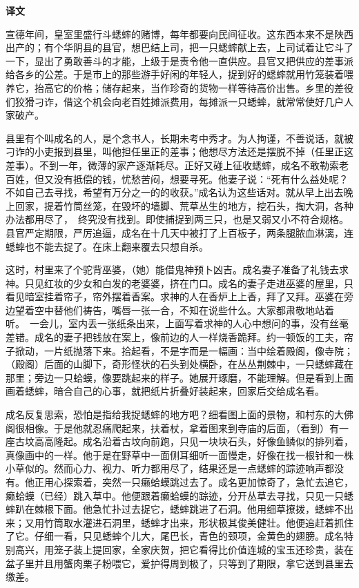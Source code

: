 \documentclass[12pt,UTF-8,openany,a4]{ctexbook}
\begin{document}
\newpage

\begin{Large}
    \noindent\textbf{译文}
\end{Large}


\vspace{1em}

\begin{large}
    \yiwen 
    宣德年间，皇室里盛行斗蟋蟀的赌博，每年都要向民间征收。这东西本来不是陕西出产的；有个华阴县的县官，想巴结上司，把一只蟋蟀献上去，上司试着让它斗了一下，显出了勇敢善斗的才能，上级于是责令他一直供应。县官又把供应的差事派给各乡的公差。于是市上的那些游手好闲的年轻人，捉到好的蟋蟀就用竹笼装着喂养它，抬高它的价格；储存起来，当作珍奇的货物一样等待高价出售。乡里的差役们狡猾刁诈，借这个机会向老百姓摊派费用，每摊派一只蟋蟀，就常常使好几户人家破产。
    
    县里有个叫成名的人，是个念书人，长期未考中秀才。为人拘谨，不善说话，就被刁诈的小吏报到县里，叫他担任里正的差事；他想尽方法还是摆脱不掉（任里正这差事）。不到一年，微薄的家产逐渐耗尽。正好又碰上征收蟋蟀，成名不敢勒索老百姓，但又没有抵偿的钱，忧愁苦闷，想要寻死。他妻子说：“死有什么益处呢？不如自己去寻找，希望有万分之一的的收获。”成名认为这些话对。就从早上出去晚上回家，提着竹筒丝笼，在毁坏的墙脚、荒草丛生的地方，挖石头，掏大洞，各种办法都用尽了， 终究没有找到。即使捕捉到两三只，也是又弱又小不符合规格。县官严定期限，严厉追逼，成名在十几天中被打了上百板子，两条腿脓血淋漓，连蟋蟀也不能去捉了。在床上翻来覆去只想自杀。
    
    这时，村里来了个驼背巫婆，（她）能借鬼神预卜凶吉。成名妻子准备了礼钱去求神。只见红妆的少女和白发的老婆婆，挤在门口。成名的妻子走进巫婆的屋里，只看见暗室挂着帘子，帘外摆着香案。求神的人在香炉上上香，拜了又拜。巫婆在旁边望着空中替他们祷告，嘴唇一张一合，不知在说些什么。大家都肃敬地站着听。 一会儿，室内丢一张纸条出来，上面写着求神的人心中想问的事，没有丝毫差错。成名的妻子把钱放在案上，像前边的人一样烧香跪拜。约一顿饭的工夫，帘子掀动，一片纸抛落下来。拾起看，不是字而是一幅画：当中绘着殿阁，像寺院；（殿阁）后面的山脚下，奇形怪状的石头到处横卧，在丛丛荆棘中，一只蟋蟀藏在那里；旁边一只蛤蟆，像要跳起来的样子。她展开琢磨，不能理解。但是看到上面画着蟋蟀，暗合自己的心事，就把纸片折叠好装起来，回家后交给成名看。
    
    成名反复思索，恐怕是指给我捉蟋蟀的地方吧？细看图上面的景物，和村东的大佛阁很相像。于是他就忍痛爬起来，扶着杖，拿着图来到寺庙的后面，（看到）有一座古坟高高隆起。成名沿着古坟向前跑，只见一块块石头，好像鱼鳞似的排列着，真像画中的一样。他于是在野草中一面侧耳细听一面慢走，好像在找一根针和一株小草似的。然而心力、视力、听力都用尽了，结果还是一点蟋蟀的踪迹响声都没有。他正用心探索着，突然一只癞蛤蟆跳过去了。成名更加惊奇了，急忙去追它，癞蛤蟆（已经）跳入草中。他便跟着癞蛤蟆的踪迹，分开丛草去寻找，只见一只蟋蟀趴在棘根下面。他急忙扑过去捉它，蟋蟀跳进了石洞。他用细草撩拨，蟋蟀不出来；又用竹筒取水灌进石洞里，蟋蟀才出来，形状极其俊美健壮。他便追赶着抓住了它。仔细一看，只见蟋蟀个儿大，尾巴长，青色的颈项，金黄色的翅膀。成名特别高兴，用笼子装上提回家，全家庆贺，把它看得比价值连城的宝玉还珍贵，装在盆子里并且用蟹肉栗子粉喂它，爱护得周到极了，只等到了期限，拿它送到县里去缴差。
    

\end{large}
\end{document}
